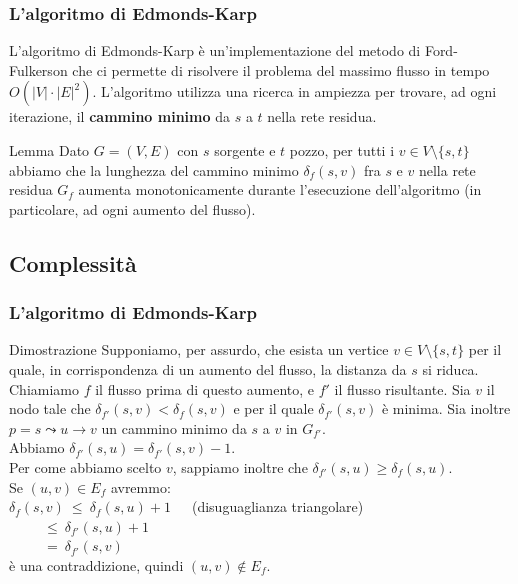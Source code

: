 \documentclass{beamer}
\begin{document}
\begin{frame}
\frametitle{L'algoritmo di Edmonds-Karp}
L'algoritmo di Edmonds-Karp è un'implementazione del metodo di Ford-Fulkerson che ci permette di risolvere il problema del massimo flusso in tempo $O(|V|\cdot|E|^2)$. L'algoritmo utilizza una ricerca in ampiezza per trovare, ad ogni iterazione, il \textbf{cammino minimo} da $s$ a $t$ nella rete residua.
\begin{block}{Lemma}
Dato $G=(V,E)$ con $s$ sorgente e $t$ pozzo, per tutti i $v\in V\setminus\{s,t\}$ abbiamo che la lunghezza del cammino minimo $\delta_f(s,v)$ fra $s$ e $v$ nella rete residua $G_f$ aumenta monotonicamente durante l'esecuzione dell'algoritmo (in particolare, ad ogni aumento del flusso).
\end{block}
\end{frame}

\subsection{Complessità}

\begin{frame}
\frametitle{L'algoritmo di Edmonds-Karp}
\begin{block}{Dimostrazione}
Supponiamo, per assurdo, che esista un vertice $v\in V\setminus\{s,t\}$ per il quale, in corrispondenza di un aumento del flusso, la distanza da $s$ si riduca. Chiamiamo $f$ il flusso prima di questo aumento, e $f'$ il flusso risultante. Sia $v$ il nodo tale che $\delta_{f'}(s,v)<\delta_f(s,v)$ e per il quale $\delta_{f'}(s,v)$ è minima. Sia inoltre $p=s\leadsto u\rightarrow v$ un cammino minimo da $s$ a $v$ in $G_{f'}$.\\
Abbiamo $\delta_{f'}(s,u)=\delta_{f'}(s,v)-1$.\\
Per come abbiamo scelto $v$, sappiamo inoltre che $\delta_{f'}(s,u)\geq \delta_f(s,u)$.\\
Se $(u,v)\in E_{f}$ avremmo:\\
$\delta_f(s,v)\ \leq\ \delta_f(s,u)+1$\ \ \ (disuguaglianza triangolare)\\
$\ \ \ \ \ \ \ \ \ \ \ \leq\ \delta_{f'}(s,u)+1$\\
$\ \ \ \ \ \ \ \ \ \ \ =\ \delta_{f'}(s,v)$\\
è una contraddizione, quindi $(u,v)\not\in E_f$.
\end{block}
\end{frame}
\end{document}
